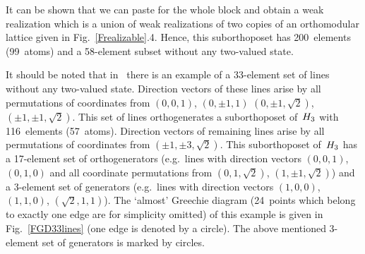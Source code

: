 It can be shown that we can paste for the whole block and obtain a weak
realization which is a union of weak realizations of two copies of an
orthomodular lattice given in Fig.~\ref{Frealizable}.4. Hence, this
suborthoposet has 200~elements (99~atoms) and a 58-element subset without
any two-valued state.


It should be noted that in~\cite{Peres2} there is an example of a 33-element
set of lines without any two-valued state. Direction vectors of these lines
arise by all permutations of coordinates from $(0,0,1)$, $(0,\pm1,1)$
$(0,\pm1,\sqrt2)$, $(\pm1,\pm1,\sqrt2)$. This set of lines orthogenerates a
suborthoposet of~$H_3$ with 116~elements (57~atoms). Direction vectors of
remaining lines arise by all permutations of coordinates from
$(\pm1,\pm3,\sqrt2)$. This suborthoposet of~$H_3$ has a 17-element set of
orthogenerators (e.g.\ lines with direction vectors $(0,0,1)$, $(0,1,0)$ and
all coordinate permutations from $(0,1,\sqrt2)$, $(1,\pm1,\sqrt2)$) and a
3-element set of generators (e.g.\ lines with direction vectors $(1,0,0)$,
$(1,1,0)$, $(\sqrt2,1,1)$). The `almost' Greechie diagram (24~points which
belong to exactly one edge are for simplicity omitted) of this example is
given in Fig.~\ref{FGD33lines} (one edge is denoted by a circle). The above
mentioned 3-element set of generators is marked by circles.


